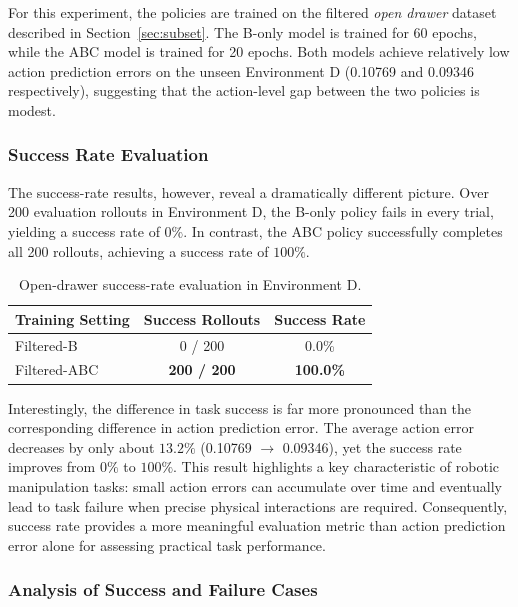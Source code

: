For this experiment, the policies are trained on the filtered \textit{open drawer} dataset described in Section~\ref{sec:subset}. The B-only model is trained for 60 epochs, while the ABC model is trained for 20 epochs. Both models achieve relatively low action prediction errors on the unseen Environment D (0.10769 and 0.09346 respectively), suggesting that the action-level gap between the two policies is modest.

\subsubsection{Success Rate Evaluation}

The success-rate results, however, reveal a dramatically different picture. Over 200 evaluation rollouts in Environment D, the B-only policy fails in every trial, yielding a success rate of $0\%$. In contrast, the ABC policy successfully completes all 200 rollouts, achieving a success rate of $100\%$.

\begin{table}[h]
\centering
\caption{Open-drawer success-rate evaluation in Environment D.}
\label{tab:open_drawer_success}
\begin{tabular}{lcc}
\toprule
Training Setting & Success Rollouts & Success Rate \\
\midrule
Filtered-B & 0 / 200 & 0.0\% \\
Filtered-ABC & \textbf{200 / 200} & \textbf{100.0\%} \\
\bottomrule
\end{tabular}
\end{table}

Interestingly, the difference in task success is far more pronounced than the corresponding difference in action prediction error. The average action error decreases by only about $13.2\%$ (0.10769 $\rightarrow$ 0.09346), yet the success rate improves from $0\%$ to $100\%$. This result highlights a key characteristic of robotic manipulation tasks: small action errors can accumulate over time and eventually lead to task failure when precise physical interactions are required. Consequently, success rate provides a more meaningful evaluation metric than action prediction error alone for assessing practical task performance.

\subsubsection{Analysis of Success and Failure Cases}


